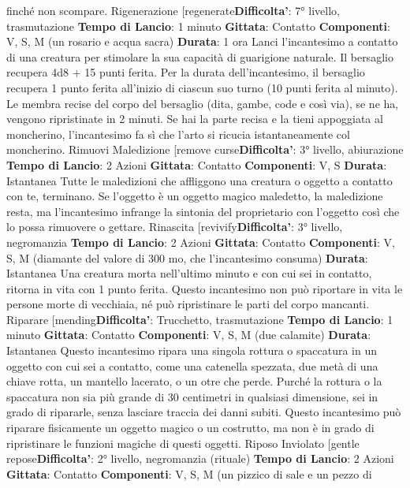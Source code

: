\begin{multicols}{2}
finché non scompare.
Rigenerazione
[regenerate\textbf{Difficolta'}:
7° livello, trasmutazione
\textbf{Tempo di Lancio}: 1 minuto
\textbf{Gittata}: Contatto
\textbf{Componenti}: V, S, M (un rosario e acqua sacra)
\textbf{Durata}: 1 ora
Lanci l’incantesimo a contatto di una creatura per
stimolare la sua capacità di guarigione naturale. Il
bersaglio recupera 4d8 + 15 punti ferita. Per la durata
dell’incantesimo, il bersaglio recupera 1 punto ferita
all’inizio di ciascun suo turno (10 punti ferita al minuto).
Le membra recise del corpo del bersaglio (dita, gambe,
code e così via), se ne ha, vengono ripristinate in 2
minuti. Se hai la parte recisa e la tieni appoggiata al
moncherino, l’incantesimo fa sì che l’arto si ricucia
istantaneamente col moncherino.
Rimuovi Maledizione
[remove curse\textbf{Difficolta'}:
3° livello, abiurazione
\textbf{Tempo di Lancio}: 2 Azioni
\textbf{Gittata}: Contatto
\textbf{Componenti}: V, S
\textbf{Durata}: Istantanea
Tutte le maledizioni che affliggono una creatura o
oggetto a contatto con te, terminano. Se l’oggetto è un
oggetto magico maledetto, la maledizione resta, ma
l’incantesimo infrange la sintonia del proprietario con
l’oggetto così che lo possa rimuovere o gettare.
Rinascita
[revivify\textbf{Difficolta'}:
3° livello, negromanzia
\textbf{Tempo di Lancio}: 2 Azioni
\textbf{Gittata}: Contatto
\textbf{Componenti}: V, S, M (diamante del valore di 300 mo,
che l’incantesimo consuma)
\textbf{Durata}: Istantanea
Una creatura morta nell’ultimo minuto e con cui sei in
contatto, ritorna in vita con 1 punto ferita. Questo
incantesimo non può riportare in vita le persone morte
di vecchiaia, né può ripristinare le parti del corpo
mancanti.
Riparare
[mending\textbf{Difficolta'}:
Trucchetto, trasmutazione
\textbf{Tempo di Lancio}: 1 minuto
\textbf{Gittata}: Contatto
\textbf{Componenti}: V, S, M (due calamite)
\textbf{Durata}: Istantanea
Questo incantesimo ripara una singola rottura o
spaccatura in un oggetto con cui sei a contatto, come
una catenella spezzata, due metà di una chiave rotta,
un mantello lacerato, o un otre che perde. Purché la
rottura o la spaccatura non sia più grande di 30
centimetri in qualsiasi dimensione, sei in grado di
ripararle, senza lasciare traccia dei danni subiti.
Questo incantesimo può riparare fisicamente un
oggetto magico o un costrutto, ma non è in grado di
ripristinare le funzioni magiche di questi oggetti.
Riposo Inviolato
[gentle repose\textbf{Difficolta'}:
2° livello, negromanzia (rituale)
\textbf{Tempo di Lancio}: 2 Azioni
\textbf{Gittata}: Contatto
\textbf{Componenti}: V, S, M (un pizzico di sale e un pezzo di

\end{multicols}
